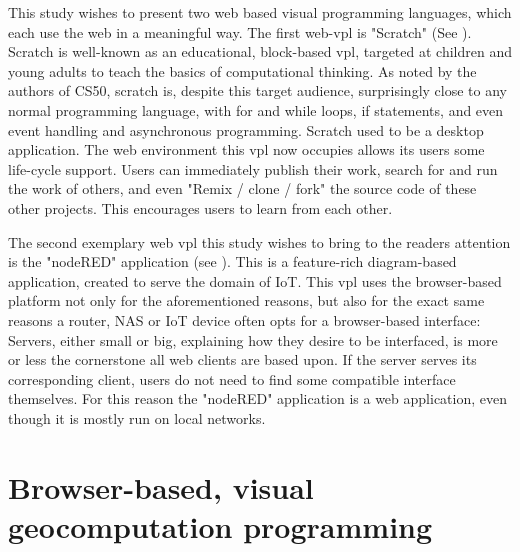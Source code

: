 This study wishes to present two web based visual programming languages, which each use the web in a meaningful way.  
The first web-vpl is "Scratch" \citep{resnick_scratch_2009} (See ). 
Scratch is well-known as an educational, block-based vpl, targeted at children and young adults to teach the basics of computational thinking.   
As noted by the authors of CS50, scratch is, despite this target audience, surprisingly close to any normal programming language, with for and while loops, if statements, and even event handling and asynchronous programming. 
Scratch used to be a desktop application. 
The web environment this vpl now occupies allows its users some life-cycle support. 
Users can immediately publish their work, search for and run the work of others, and even "Remix / clone / fork" the source code of these other projects. 
This encourages users to learn from each other.


The second exemplary web vpl this study wishes to bring to the readers attention is the "nodeRED" application \citep{openjs_foundation_node-red_2022} (see ). 
This is a feature-rich diagram-based application, created to serve the domain of IoT.
This vpl uses the browser-based platform not only for the aforementioned  reasons, but also for the exact same reasons a router, NAS or IoT device often opts for a browser-based interface: 
Servers, either small or big, explaining how they desire to be interfaced, is more or less the cornerstone all web clients are based upon.  
If the server serves its corresponding client, users do not need to find some compatible interface themselves.
For this reason the "nodeRED" application is a web application, even though it is mostly run on local networks.   

\section{Browser-based, visual geocomputation programming} 

